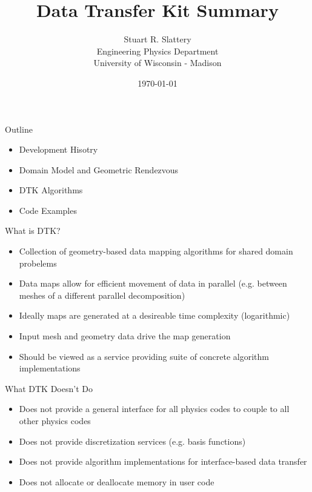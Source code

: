 \documentclass{beamer}
\author{Stuart R. Slattery
  \\ Engineering Physics Department
  \\ University of Wisconsin - Madison
}
\date{\today}
\title{Data Transfer Kit Summary}
\begin{document}
\maketitle

\begin{frame}{Outline}

  \begin{itemize}
  \item Development Hisotry
    \medskip
  \item Domain Model and Geometric Rendezvous
    \medskip
  \item DTK Algorithms
    \medskip
  \item Code Examples
  \end{itemize}

\end{frame}

\begin{frame}{What is DTK?}

  \begin{itemize}
  \item Collection of geometry-based data mapping algorithms for
    shared domain probelems
    \medskip
  \item Data maps allow for efficient movement of data in parallel
    (e.g. between meshes of a different parallel decomposition)
    \medskip
  \item Ideally maps are generated at a desireable time complexity
    (logarithmic)
    \medskip
  \item Input mesh and geometry data drive the map generation
    \medskip
  \item Should be viewed as a service providing suite of concrete
    algorithm implementations
  \end{itemize}
 
\end{frame}

\begin{frame}{What DTK Doesn't Do}

  \begin{itemize}
  \item Does not provide a general interface for all physics codes to
    couple to all other physics codes
    \medskip
  \item Does not provide discretization services (e.g. basis functions)
    \medskip
  \item Does not provide algorithm implementations for interface-based
    data transfer
    \medskip
  \item Does not allocate or deallocate memory in user code
  \end{itemize}

\end{frame}
\end{document}
